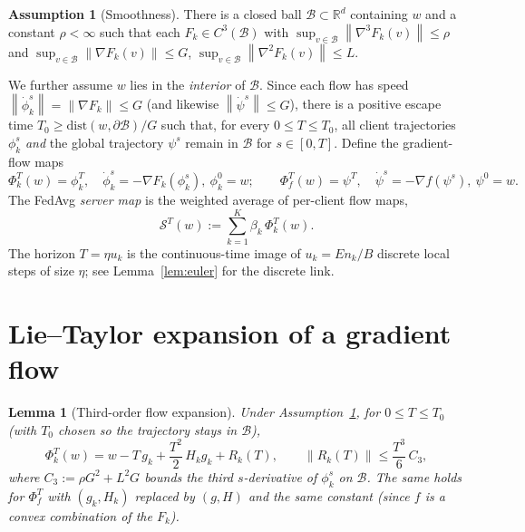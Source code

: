 \documentclass[11pt]{article}
\newtheorem{lemma}{Lemma}
\theoremstyle{definition}
\newtheorem{assumption}{Assumption}
\newcommand{\R}{\mathbb{R}}
\newcommand{\norm}[1]{\left\lVert#1\right\rVert}
\newcommand{\grad}{\nabla}
\begin{document}
\begin{assumption}[Smoothness]\label{ass:smooth}
There is a closed ball $\mathcal B\subset\R^d$ containing $w$ and a constant
$\rho<\infty$ such that each $F_k\in C^3(\mathcal B)$ with
$\sup_{v\in\mathcal B}\norm{\grad^3 F_k(v)}\le\rho$ and
$\sup_{v\in\mathcal B}\norm{\grad F_k(v)}\le G$,
$\sup_{v\in\mathcal B}\norm{\grad^2 F_k(v)}\le L$.
\end{assumption}

We further assume $w$ lies in the \emph{interior} of $\mathcal B$. Since each
flow has speed $\norm{\dot\phi_k^s}=\norm{\grad F_k}\le G$ (and likewise
$\norm{\dot\psi^s}\le G$), there is a positive escape time
$T_0\ge \mathrm{dist}(w,\partial\mathcal B)/G$ such that, for every
$0\le T\le T_0$, all client trajectories $\phi_k^s$ \emph{and} the global
trajectory $\psi^s$ remain in $\mathcal B$ for $s\in[0,T]$. Define the
gradient-flow maps
\begin{equation}
\Phi_k^{T}(w)=\phi_k^{T},\quad \dot\phi_k^{s}=-\grad F_k(\phi_k^{s}),\ \phi_k^0=w;
\qquad
\Phi_f^{T}(w)=\psi^{T},\quad \dot\psi^{s}=-\grad f(\psi^{s}),\ \psi^0=w.
\label{eq:flows}
\end{equation}
The FedAvg \emph{server map} is the weighted average of per-client flow maps,
\begin{equation}
\mathcal S^{T}(w):=\sum_{k=1}^K\beta_k\,\Phi_k^{T}(w).
\label{eq:server}
\end{equation}
The horizon $T=\eta u_k$ is the continuous-time image of $u_k=En_k/B$ discrete
local steps of size $\eta$; see Lemma~\ref{lem:euler} for the discrete link.

\section{Lie--Taylor expansion of a gradient flow}

\begin{lemma}[Third-order flow expansion]\label{lem:lie}
Under Assumption~\ref{ass:smooth}, for $0\le T\le T_0$ (with $T_0$ chosen so the
trajectory stays in $\mathcal B$),
\begin{equation}
\Phi_k^{T}(w)=w-T\,g_k+\frac{T^2}{2}\,H_k g_k+R_k(T),
\qquad
\norm{R_k(T)}\le \frac{T^3}{6}\,C_3,
\label{eq:lie}
\end{equation}
where $C_3:=\rho G^2+L^2 G$ bounds the third $s$-derivative of $\phi_k^s$ on
$\mathcal B$. The same holds for $\Phi_f^{T}$ with $(g_k,H_k)$ replaced by
$(g,H)$ and the same constant (since $f$ is a convex combination of the $F_k$).
\end{lemma}
\end{document}
